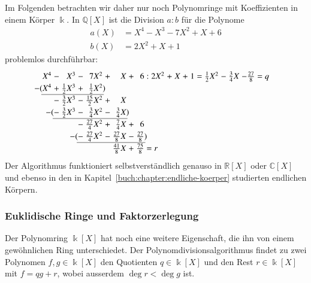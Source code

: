 \begin{beispiel}
Im Folgenden betrachten wir daher nur noch Polynomringe mit Koeffizienten
in einem Körper $\Bbbk$.
In $\mathbb{Q}[X]$ ist die Division $a:b$ für die Polynome
\begin{equation}
\begin{aligned}
a(X) &= X^4 - X^3 -7X^2 + X + 6\\
b(X) &= 2X^2+X+1
\end{aligned}
\label{buch:polynome:eqn:divisionsaufgabe2}
\end{equation}
problemlos durchführbar:
\[
\arraycolsep=1.4pt
\renewcommand{\arraystretch}{1.2}
\begin{array}{rcrcrcrcrcrcrcrcrcrcr}
X^4&-&       X^3&-&         7X^2&+&          X&+&           6&:&2X^2&+&X&+&1&=&\frac12X^2&-&\frac34X&-\frac{27}{8} = q\\
\llap{$-($}X^4&+&\frac12X^3&+&   \frac12X^2\rlap{$)$}& &           & &            & &    & & & & & &          & &        &             \\ \cline{1-5}
   &-&\frac32X^3&-&\frac{15}2X^2&+&          X& &            & &    & & & & & &          & &        &             \\
   &\llap{$-($}-&\frac32X^3&-&\frac{ 3}4X^2&-&\frac{ 3}4X\rlap{$)$}& &            & &    & & & & & &          & &        &             \\\cline{2-7}
   & &          &-&\frac{27}4X^2&+&\frac{ 7}4X&+&           6& &    & & & & & &          & &        &             \\
   & &          &\llap{$-($}-&\frac{27}4X^2&-&\frac{27}8X&-&\frac{27}{8}\rlap{$)$}& &    & & & & & &          & &        &             \\\cline{4-9}
   & &          & &             & &\frac{41}8X&+&\frac{75}{8}\rlap{$\mathstrut=r$}& &    & & & & & &          & &        &             \\
\end{array}
\]
Der Algorithmus funktioniert selbstverständlich genauso in $\mathbb{R}[X]$
oder $\mathbb{C}[X]$ und ebenso in den in
Kapitel~\ref{buch:chapter:endliche-koerper} studierten endlichen Körpern.
\end{beispiel}

\subsubsection{Euklidische Ringe und Faktorzerlegung}
Der Polynomring $\Bbbk[X]$ hat noch eine weitere Eigenschaft, die ihn
von einem gewöhnlichen Ring unterschiedet.
Der Polynomdivisionsalgorithmus findet zu zwei Polynomen $f,g\in\Bbbk[X]$
den Quotienten $q\in\Bbbk[X]$ und den Rest $r\in\Bbbk[X]$ mit
$f=qg+r$, wobei ausserdem $\deg r<\deg g$ ist.

